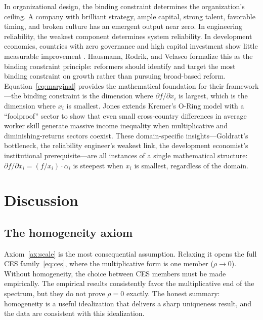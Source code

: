 \documentclass[12pt, a4paper]{article}
\theoremstyle{definition}
\theoremstyle{remark}
\begin{document}
In organizational design, the binding constraint determines the organization's ceiling. A company with brilliant strategy, ample capital, strong talent, favorable timing, and broken culture has an emergent output near zero. In engineering reliability, the weakest component determines system reliability. In development economics, countries with zero governance and high capital investment show little measurable improvement \cite{easterly2006}. Hausmann, Rodrik, and Velasco \cite{hrv2005} formalize this as the binding constraint principle: reformers should identify and target the most binding constraint on growth rather than pursuing broad-based reform. Equation~\eqref{eq:marginal} provides the mathematical foundation for their framework---the binding constraint is the dimension where $\partial f / \partial x_i$ is largest, which is the dimension where $x_i$ is smallest. Jones \cite{jones2013} extends Kremer's O-Ring model with a ``foolproof'' sector to show that even small cross-country differences in average worker skill generate massive income inequality when multiplicative and diminishing-returns sectors coexist. These domain-specific insights---Goldratt's bottleneck, the reliability engineer's weakest link, the development economist's institutional prerequisite---are all instances of a single mathematical structure: $\partial f / \partial x_i = (f / x_i) \cdot \alpha_i$ is steepest when $x_i$ is smallest, regardless of the domain.


\section{Discussion}\label{sec:discussion}

\subsection{The homogeneity axiom}\label{sec:homogeneity}

Axiom~\ref{ax:scale} is the most consequential assumption. Relaxing it opens the full CES family~\eqref{eq:ces}, where the multiplicative form is one member ($\rho \to 0$). Without homogeneity, the choice between CES members must be made empirically. The empirical results consistently favor the multiplicative end of the spectrum, but they do not prove $\rho = 0$ exactly. The honest summary: homogeneity is a useful idealization that delivers a sharp uniqueness result, and the data are consistent with this idealization.
\end{document}
